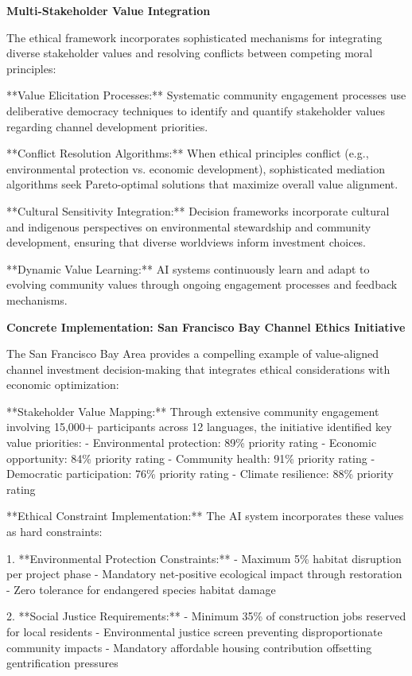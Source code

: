 \documentclass{article}
\begin{document}
\textbf{Multi-Stakeholder Value Integration}

The ethical framework incorporates sophisticated mechanisms for integrating diverse stakeholder values and resolving conflicts between competing moral principles:

**Value Elicitation Processes:** Systematic community engagement processes use deliberative democracy techniques to identify and quantify stakeholder values regarding channel development priorities.

**Conflict Resolution Algorithms:** When ethical principles conflict (e.g., environmental protection vs. economic development), sophisticated mediation algorithms seek Pareto-optimal solutions that maximize overall value alignment.

**Cultural Sensitivity Integration:** Decision frameworks incorporate cultural and indigenous perspectives on environmental stewardship and community development, ensuring that diverse worldviews inform investment choices.

**Dynamic Value Learning:** AI systems continuously learn and adapt to evolving community values through ongoing engagement processes and feedback mechanisms.

\textbf{Concrete Implementation: San Francisco Bay Channel Ethics Initiative}

The San Francisco Bay Area provides a compelling example of value-aligned channel investment decision-making that integrates ethical considerations with economic optimization:

**Stakeholder Value Mapping:**
Through extensive community engagement involving 15,000+ participants across 12 languages, the initiative identified key value priorities:
- Environmental protection: 89\% priority rating
- Economic opportunity: 84\% priority rating  
- Community health: 91\% priority rating
- Democratic participation: 76\% priority rating
- Climate resilience: 88\% priority rating

**Ethical Constraint Implementation:**
The AI system incorporates these values as hard constraints:

1. **Environmental Protection Constraints:**
   - Maximum 5\% habitat disruption per project phase
   - Mandatory net-positive ecological impact through restoration
   - Zero tolerance for endangered species habitat damage

2. **Social Justice Requirements:**
   - Minimum 35\% of construction jobs reserved for local residents
   - Environmental justice screen preventing disproportionate community impacts
   - Mandatory affordable housing contribution offsetting gentrification pressures
\end{document}
